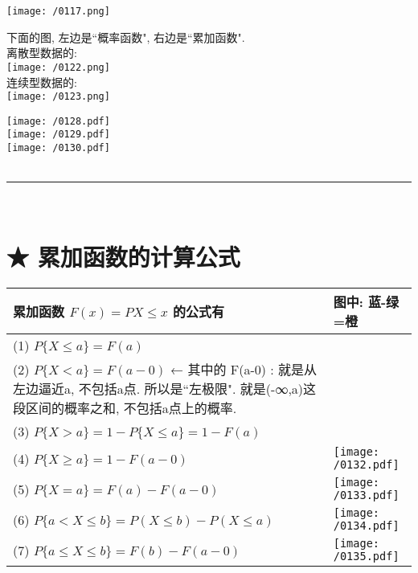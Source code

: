 \documentclass[UTF8]{ctexart}
\begin{document}
	\texttt{[image: /0117.png]} \\
	
	
	
	
	
	\begin{myEnvSample}
		下面的图, 左边是``概率函数", 右边是``累加函数". \\
		
		离散型数据的: \\
		\texttt{[image: /0122.png]} \\
		
		连续型数据的: \\
		\texttt{[image: /0123.png]} 
	\end{myEnvSample} 
	
	
	\texttt{[image: /0128.pdf]} \\
	
	\texttt{[image: /0129.pdf]} \\
	
	\texttt{[image: /0130.pdf]} \\
	
	
	~\\
	\hrule
	~\\
	
	
	\section{ ★  累加函数的计算公式}
	
	\begin{tabular}{|p{}|p{}|}
		\hline
		累加函数 $F(x)=P{X \leq x}$ 的公式有 & 图中: 蓝-绿=橙 \\
		\hline
		(1) $P\{X \leq a\} = F(a)$ &  \\ \hline
		(2)  $P\{X < a\} = F(a-0)$ ← 其中的 F(a-0) : 就是从左边逼近a, 不包括a点. 所以是``左极限". 就是(-∞,a)这段区间的概率之和, 不包括a点上的概率.  &  \\ \hline
		(3) $P\{X > a\} = 1- P\{X \leq a\} = 1- F(a)$ &  \\ \hline
		(4) $P\{X \geq a\} = 1- F(a-0)$ & \texttt{[image: /0132.pdf]}
		\\ \hline
		(5) $P\{X=a\} = F(a) - F(a-0)$ &  \texttt{[image: /0133.pdf]}\\ \hline
		(6) $P\{a < X \leq b\} = P(X \leq b) - P(X \leq a)$ &    \texttt{[image: /0134.pdf]}\\ \hline
		(7) $P\{a \leq X \leq b\} = F(b) - F(a-0)$ &   \texttt{[image: /0135.pdf]} \\ \hline
	\end{tabular}
	
\end{document}
